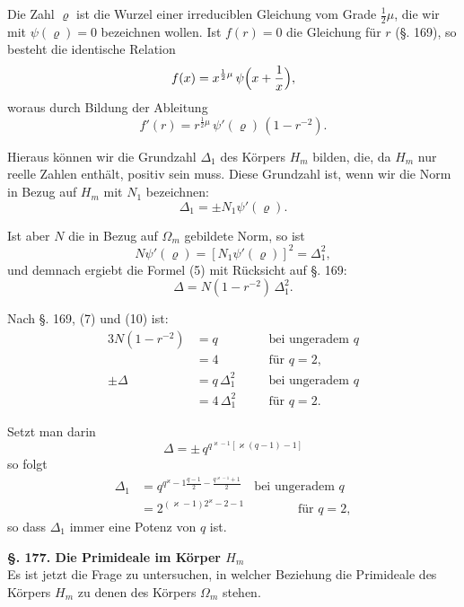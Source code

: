 \documentclass[12pt,a4paper]{article}
\begin{document}
Die Zahl $\varrho$ ist die Wurzel einer irreduciblen Gleichung vom Grade $\frac{1}{2}\mu$, die wir mit $\psi(\varrho) = 0$ bezeichnen wollen. Ist $f(r) = 0$ die Gleichung für $r$ (\S. 169), so besteht die identische Relation
\begin{equation}\label{eq:176-4}
f(x) = x^{\frac{1}{2}\mu}\,\psi\Bigl(x + \frac{1}{x}\Bigr),
\end{equation}
woraus durch Bildung der Ableitung
\begin{equation}\label{eq:176-5}
f'(r) = r^{\frac{1}{2}\mu}\,\psi'(\varrho)\,(1 - r^{-2}).
\end{equation}

Hieraus können wir die Grundzahl $\Delta_1$ des Körpers $H_m$ bilden, die, da $H_m$ nur reelle Zahlen enthält, positiv sein muss. Diese Grundzahl ist, wenn wir die Norm in Bezug auf $H_m$ mit $N_1$ bezeichnen:
\[
\Delta_1 = \pm N_1\psi'(\varrho).
\]

Ist aber $N$ die in Bezug auf $\Omega_m$ gebildete Norm, so ist
\[
N\psi'(\varrho) = [N_1\psi'(\varrho)]^2 = \Delta_1^2,
\]
und demnach ergiebt die Formel (5) mit Rücksicht auf \S. 169:
\[
\Delta = N(1 - r^{-2})\,\Delta_1^2.
\]

Nach \S. 169, (7) und (10) ist:
\begin{alignat*}{3}
N(1 - r^{-2}) &= q &\quad &\text{bei ungeradem } q\\
&= 4 &\quad &\text{für } q = 2,\\
\pm\Delta &= q\,\Delta_1^2 &\quad &\text{bei ungeradem } q\\
&= 4\,\Delta_1^2 &\quad &\text{für } q = 2.
\end{alignat*}

Setzt man darin
\[
\Delta = \pm\, q^{q^{\varkappa-1}[\varkappa(q-1)-1]}
\]
so folgt
\begin{equation}\label{eq:176-7}
\begin{aligned}
\Delta_1 &= q^{q^{\varkappa}-1\frac{q-1}{2} - \frac{q^{\varkappa-1}+1}{2}} \quad \text{bei ungeradem } q\\
&= 2^{(\varkappa-1)2^{\varkappa}-2-1} \qquad\qquad\; \text{für } q = 2,
\end{aligned}
\end{equation}
so dass $\Delta_1$ immer eine Potenz von $q$ ist.

\bigskip\noindent\textbf{\S. 177. Die Primideale im Körper $H_m$}\\[4pt]

Es ist jetzt die Frage zu untersuchen, in welcher Beziehung die Primideale des Körpers $H_m$ zu denen des Körpers $\Omega_m$ stehen.
\end{document}
